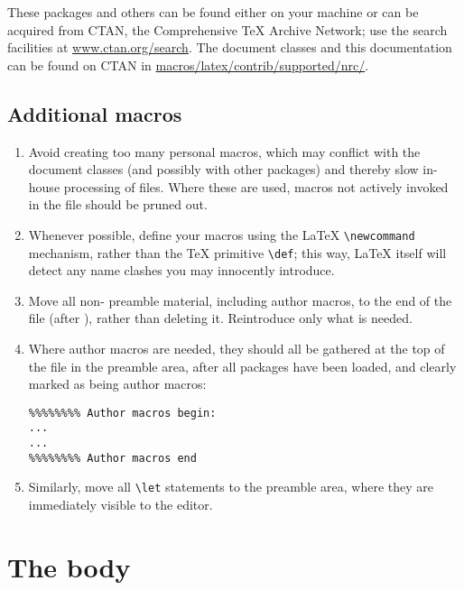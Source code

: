 \noindent These packages and others can be found either on your
machine or can be acquired from {\small CTAN}, the Comprehensive
\TeX{} Archive Network; use the search facilities at
\url{www.ctan.org/search}. The \NRC{} document classes and this
documentation can be found on {\small CTAN} in
\url{macros/latex/contrib/supported/nrc/}.


\subsection{Additional macros}

\begin{enumerate} \itemsep=0pt
   \item Avoid creating too many personal macros, which may conflict
         with the \NRC{} document classes (and possibly with other
         packages) and thereby slow in-house processing of files.
         Where these are used, macros not actively invoked in the
         file should be pruned out.

   \item Whenever possible, define your macros using the \LaTeX{}
         \verb|\newcommand| mechanism, rather than the \TeX{} primitive
         \verb|\def|; this way, \LaTeX{} itself will detect any name
         clashes you may innocently introduce. 

   \item Move all non-\NRC{} preamble material, including author
         macros, to the end of the file (after \verb||),
         rather than deleting it. Reintroduce only what is needed. 

   \item Where author macros are needed, they should all be gathered
         at the top of the file in the preamble area, after all
         packages have been loaded, and clearly marked as being author
         macros:\label{authmacros}

\begin{verbatim}
%%%%%%%% Author macros begin:
...
... 
%%%%%%%% Author macros end
\end{verbatim}

   \item Similarly, move all \verb|\let| statements to the preamble
         area, where they are immediately visible to the editor. 
\end{enumerate}


\section{The body}

